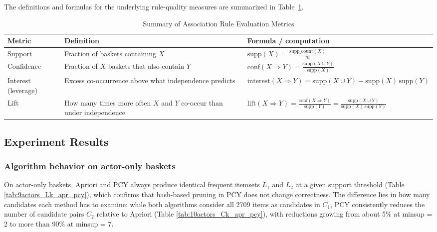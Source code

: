 \documentclass{article}  %
\begin{document}
The definitions and formulas for the underlying rule-quality measures are
summarized in Table~\ref{tab:8}. 
\begin{table}[!htbp]
    \caption{Summary of Association Rule Evaluation Metrics}
    \centering
    \normalsize
    \begin{tabularx}{\textwidth}{lXX}
        \toprule
        \textbf{Metric} & \textbf{Definition} & \textbf{Formula / computation} \\
        \midrule
        Support &
        Fraction of baskets containing \(X\) &
        \(\displaystyle
        \mathrm{supp}(X)=\frac{\mathrm{supp\_count}(X)}{m}
        \) \\
        Confidence &
        Fraction of \(X\)-baskets that also contain \(Y\) &
        \(\displaystyle
        \mathrm{conf}(X \Rightarrow Y)=\frac{\mathrm{supp}(X \cup Y)}{\mathrm{supp}(X)}
        \) \\
        Interest (leverage) &
        Excess co-occurrence above what independence predicts &
        \(\displaystyle
        \mathrm{interest}(X \Rightarrow Y)=\mathrm{supp}(X \cup Y)-\mathrm{supp}(X)\,\mathrm{supp}(Y)
        \) \\
        Lift &
        How many times more often \(X\) and \(Y\) co-occur than under independence &
        \(\displaystyle
        \mathrm{lift}(X \Rightarrow Y)=\frac{\mathrm{conf}(X \Rightarrow Y)}{\mathrm{supp}(Y)}
        =\frac{\mathrm{supp}(X \cup Y)}{\mathrm{supp}(X)\,\mathrm{supp}(Y)}
        \) \\
        \bottomrule
    \end{tabularx}
    \label{tab:8}
\end{table}

\subsection{Experiment Results}

\subsubsection{Algorithm behavior on actor-only baskets}

On actor-only baskets, Apriori and PCY always produce identical frequent itemsets \(L_1\) and \(L_2\) at a given support threshold (Table \ref{tab:9actors_Lk_apr_pcy}), which confirms that hash-based pruning in PCY does not change correctness. The difference lies in how many candidates each method has to examine: while both algorithms consider all 2709 items as candidates in \(C_1\), PCY consistently reduces the number of candidate pairs \(C_2\) relative to Apriori (Table \ref{tab:10actors_Ck_apr_pcy}), with reductions growing from about 5\% at minsup = 2 to more than 90\% at minsup = 7.
\end{document}

